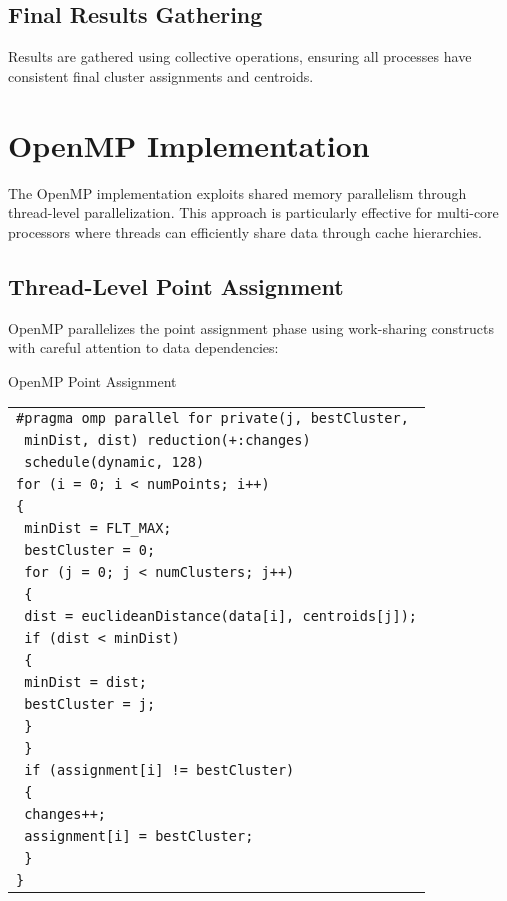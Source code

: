 \documentclass[10pt,a4paper,twocolumn]{article}
\makeatletter
\newcounter{alglineno}
\newenvironment{algtabular}{%
\setcounter{alglineno}{0}%
\begin{tabular}{@{\stepcounter{alglineno}\makebox[1.2em][r]{\tiny\thealglineno:}\hspace{0.2em}}l@{}}%
}{%
\end{tabular}%
}
\makeatother
\begin{document}
\subsection{Final Results Gathering}

Results are gathered using collective operations, ensuring all processes have consistent final cluster assignments and centroids.

\section{OpenMP Implementation}

The OpenMP implementation exploits shared memory parallelism through thread-level parallelization. This approach is particularly effective for multi-core processors where threads can efficiently share data through cache hierarchies.

\subsection{Thread-Level Point Assignment}

OpenMP parallelizes the point assignment phase using work-sharing constructs with careful attention to data dependencies:

\begin{algorithm}[H]
\caption{OpenMP Point Assignment}
\label{alg:omp_assignment}
\begin{algtabular}
\texttt{\#pragma omp parallel for private(j, bestCluster,} \\
\texttt{                    minDist, dist) reduction(+:changes)} \\
\texttt{                    schedule(dynamic, 128)} \\
\texttt{for (i = 0; i < numPoints; i++)} \\
\texttt{\{} \\
\texttt{  minDist = FLT\_MAX;} \\
\texttt{  bestCluster = 0;} \\
\texttt{  for (j = 0; j < numClusters; j++)} \\
\texttt{  \{} \\
\texttt{    dist = euclideanDistance(data[i], centroids[j]);} \\
\texttt{    if (dist < minDist)} \\
\texttt{    \{} \\
\texttt{      minDist = dist;} \\
\texttt{      bestCluster = j;} \\
\texttt{    \}} \\
\texttt{  \}} \\
\texttt{  if (assignment[i] != bestCluster)} \\
\texttt{  \{} \\
\texttt{    changes++;} \\
\texttt{    assignment[i] = bestCluster;} \\
\texttt{  \}} \\
\texttt{\}} \\
\end{algtabular}
\end{algorithm}
\end{document}
